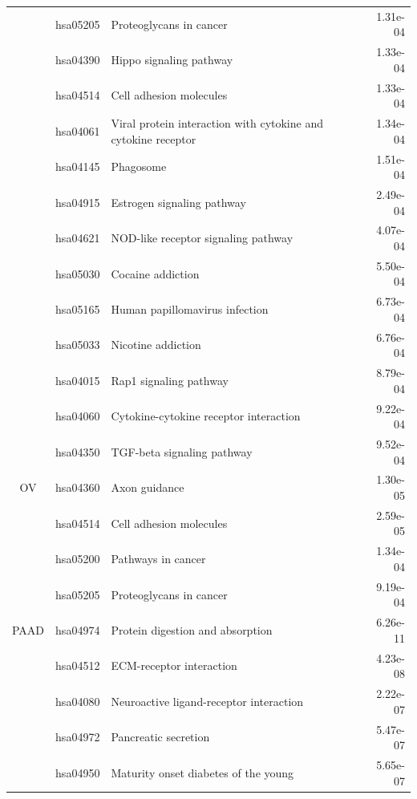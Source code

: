 \begin{longtable}{cllr}
 & hsa05205 & \textcolor{\clrnew}{Proteoglycans in cancer} & 1.31e-04 \\ 
 & hsa04390 & \textcolor{\clrnew}{Hippo signaling pathway} & 1.33e-04 \\ 
 & hsa04514 & \textcolor{\clrnew}{Cell adhesion molecules} & 1.33e-04 \\ 
 & hsa04061 & \textcolor{\clrnew}{Viral protein interaction with cytokine and cytokine receptor} & 1.34e-04 \\ 
 \rowcolor{\clrmatch}& hsa04145 & Phagosome & 1.51e-04 \\ 
 & hsa04915 & \textcolor{\clrnew}{Estrogen signaling pathway} & 2.49e-04 \\ 
 & hsa04621 & \textcolor{\clrnew}{NOD-like receptor signaling pathway} & 4.07e-04 \\ 
 & hsa05030 & \textcolor{\clrnew}{Cocaine addiction} & 5.50e-04 \\ 
 & hsa05165 & \textcolor{\clrnew}{Human papillomavirus infection} & 6.73e-04 \\ 
 & hsa05033 & \textcolor{\clrnew}{Nicotine addiction} & 6.76e-04 \\ 
 & hsa04015 & \textcolor{\clrnew}{Rap1 signaling pathway} & 8.79e-04 \\ 
 & hsa04060 & \textcolor{\clrnew}{Cytokine-cytokine receptor interaction} & 9.22e-04 \\ 
 & hsa04350 & \textcolor{\clrnew}{TGF-beta signaling pathway} & 9.52e-04 \\ 
\midrule 
OV & hsa04360 & \textcolor{\clrnew}{Axon guidance} & 1.30e-05\\ 
 & hsa04514 & \textcolor{\clrnew}{Cell adhesion molecules} & 2.59e-05 \\ 
 & hsa05200 & \textcolor{\clrnew}{Pathways in cancer} & 1.34e-04 \\ 
 & hsa05205 & \textcolor{\clrnew}{Proteoglycans in cancer} & 9.19e-04 \\ 
\midrule 
\rowcolor{\clrmatch}PAAD & hsa04974 & Protein digestion and absorption & 6.26e-11\\ 
 \rowcolor{\clrmatch}& hsa04512 & ECM-receptor interaction & 4.23e-08 \\ 
 & hsa04080 & \textcolor{\clrnew}{Neuroactive ligand-receptor interaction} & 2.22e-07 \\ 
 & hsa04972 & \textcolor{\clrnew}{Pancreatic secretion} & 5.47e-07 \\ 
 \rowcolor{\clrmatch}& hsa04950 & Maturity onset diabetes of the young & 5.65e-07 \\ 

\end{longtable}
